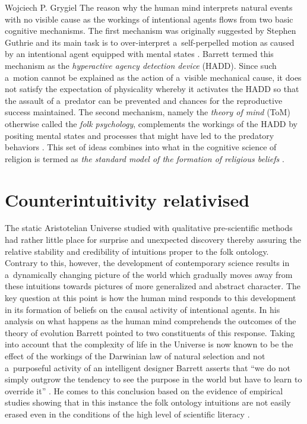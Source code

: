 \begin{artengenv}{Wojciech P. Grygiel}
The reason why the human mind interprets natural events with no visible cause as the workings of intentional agents flows from two basic cognitive mechanisms. The first mechanism was originally suggested by Stephen Guthrie and its main task is to over-interpret a~self-perpelled motion as caused by an intentional agent equipped with mental states
\parencite[][]{guthrie_faces_1993}. %
 Barrett 
\parencite*[][]{barrett_exploring_2000} %
 termed this mechanism as the \textit{hyperactive agency detection device} (HADD). Since such a~motion cannot be explained as the action of a~visible mechanical cause, it does not satisfy the expectation of physicality whereby it activates the HADD so that the assault of a~predator can be prevented and chances for the reproductive success maintained. The second mechanism, namely the \textit{theory of mind} (ToM) otherwise called the \textit{folk psychology}, complements the workings of the HADD by positing mental states and processes that might have led to the predatory behaviors 
\parencite[e.g.][pp.74–77]{barrett_cognitive_2011}. %
 This set of ideas combines into what in the cognitive science of religion is termed as \textit{the standard model of the formation of religious beliefs} 
\parencite[][pp.183–189]{murray_evolutionary_2010}. %


\section*{Counterintuitivity relativised}
The static Aristotelian Universe studied with qualitative pre-scientific methods had rather little place for surprise and unexpected discovery thereby assuring the relative stability and credibility of intuitions proper to the folk ontology. Contrary to this, however, the development of contemporary science results in a~dynamically changing picture of the world which gradually moves away from these intuitions towards pictures of more generalized and abstract character. The key question at this point is how the human mind responds to this development in its formation of beliefs on the causal activity of intentional agents. In his analysis on what happens as the human mind comprehends the outcomes of the theory of evolution Barrett pointed to two constituents of this response. Taking into account that the complexity of life in the Universe is now known to be the effect of the workings of the Darwinian law of natural selection and not a~purposeful activity of an intelligent designer Barrett asserts that ``we do not simply outgrow the tendency to see the purpose in the world but have to learn to override it''
\parencite[][p.71]{barrett_cognitive_2011}. %
 He comes to this conclusion based on the evidence of empirical studies showing that in this instance the folk ontology intuitions are not easily erased even in the conditions of the high level of scientific literacy 
\parencite[e.g.][]{casler_developmental_2008}.%



\end{artengenv}
